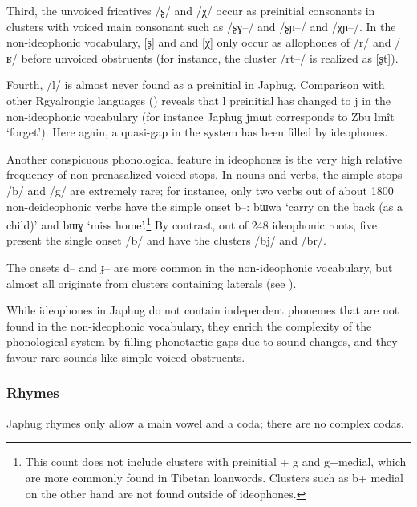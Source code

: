 \documentclass[oldfontcommands,oneside,a4paper,11pt]{article}
\newcommand{\ipa}[1]{{\phon \mbox{#1}}} %
\begin{document}
Third, the unvoiced fricatives /\ipa{ʂ}/ and /\ipa{χ}/ occur  as preinitial consonants in clusters with voiced main consonant such as /\ipa{ʂɣ--}/ and /\ipa{ʂɲ--}/ and /\ipa{χɲ--}/. In the non-ideophonic vocabulary, [ʂ] and and [χ] only occur as allophones of /\ipa{r}/ and /\ipa{ʁ}/ before unvoiced obstruents (for instance, the cluster /\ipa{rt--}/ is realized as [ʂt]). 

Fourth, /\ipa{l}/ is almost never found as a preinitial in Japhug. Comparison with other Rgyalrongic languages (\citealt[271-2]{jacques04these}) reveals that \ipa{l} preinitial has changed to \ipa{j} in the non-ideophonic vocabulary (for instance Japhug \ipa{jmɯt} corresponds to Zbu \ipa{lmît} `forget'). Here again, a quasi-gap in the system has been filled by ideophones.




Another conspicuous phonological feature in ideophones is the very high relative frequency of non-prenasalized voiced stops. In nouns and verbs, the simple stops /\ipa{b}/ and /\ipa{g}/ are extremely rare; for instance, only two verbs out of about 1800 non-deideophonic verbs have the simple onset \ipa{b--}: \ipa{bɯwa} `carry on the back (as a child)' and \ipa{bɯɣ} `miss home'.\footnote{This count does not include clusters with preinitial + \ipa{g} and \ipa{g}+medial, which are more commonly found in Tibetan loanwords. Clusters such as \ipa{b}+ medial on the other hand are not found outside of ideophones.}  By contrast, out of 248 ideophonic roots, five present the single onset /\ipa{b}/ and  have the clusters  /\ipa{bj}/ and  /\ipa{br}/.

The onsets \ipa{d--} and \ipa{ɟ--} are more common in the non-ideophonic vocabulary, but almost all originate from clusters containing laterals (see \citealt[313-4]{jacques04these}).

While ideophones in Japhug do not contain independent phonemes that are not found  in the non-ideophonic vocabulary, they enrich the complexity of the phonological system by filling phonotactic gaps due to sound changes, and they favour rare sounds like simple voiced obstruents.

 \subsubsection{Rhymes}
 Japhug rhymes only allow a main vowel and a coda; there are no complex codas.
 
\end{document}
